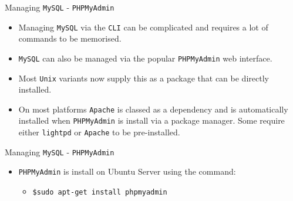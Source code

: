 \documentclass[xcolor=table]{beamer}
\begin{document}
\begin{frame}{Managing \texttt{MySQL} - \texttt{PHPMyAdmin}}
  \begin{itemize}
    \item Managing \texttt{MySQL} via the \texttt{CLI} can be complicated and requires a lot of commands to be memorised. 
    \item \texttt{MySQL} can also be managed via the popular \texttt{PHPMyAdmin} web interface.
    \item Most \texttt{Unix} variants now supply this as a package that can be directly installed.
    \item On most platforms \texttt{Apache} is classed as a dependency and is automatically installed when \texttt{PHPMyAdmin} is install via a package manager. Some require either \texttt{lightpd} or \texttt{Apache} to be pre-installed.
  \end{itemize}
\end{frame}

\begin{frame}{Managing \texttt{MySQL} - \texttt{PHPMyAdmin}}
  \begin{itemize}
    \item \texttt{PHPMyAdmin} is install on Ubuntu Server using the command:
      \begin{itemize}
        \item \texttt{\$sudo apt-get install phpmyadmin}
      \end{itemize}
  \end{itemize}
\end{frame}
\end{document}
